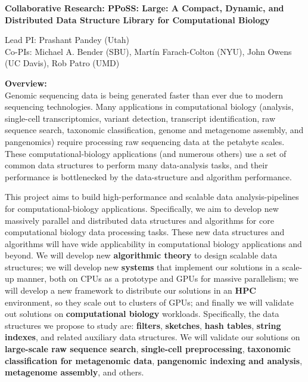 
\begin{center}
\bf
\Large
Collaborative Research: PPoSS\@: Large: A Compact, Dynamic, and Distributed Data
Structure Library for Computational Biology

\medskip
\small
Lead PI: Prashant Pandey (Utah)\\
Co-PIs: Michael A. Bender (SBU), Mart\'{i}n Farach-Colton (NYU), John Owens (UC Davis), Rob Patro (UMD)
\end{center}

\noindent \textbf{\large Overview:}\\
Genomic sequencing data is being generated faster than ever due to modern sequencing technologies.
Many applications in computational biology (\kmer analysis, single-cell transcriptomics, variant detection, transcript identification, raw sequence search, taxonomic classification, genome and metagenome assembly, and pangenomics) require processing raw sequencing data at the petabyte scales.
%
These computational-biology applications (and numerous others) use a set of common data structures to perform many data-analysis tasks, and their performance is bottlenecked by the data-structure and algorithm performance.

This project aims to build high-performance and scalable data analysis-pipelines for computational-biology applications. Specifically, we aim to develop new massively parallel and distributed data structures and algorithms for core computational biology data processing tasks. These new data structures and algorithms will have wide applicability in computational biology applications and beyond.
%
We will develop new \textbf{algorithmic theory} to design scalable data structures; we will develop new \textbf{systems} that implement our solutions in a scale-up manner,  both on CPUs as a prototype and GPUs for massive parallelism; we will develop a new framework to distribute our solutions in an \textbf{HPC} environment, so they scale out to clusters of GPUs; and finally we will validate out solutions on \textbf{computational biology} workloads.
%
Specifically, the data structures we propose to study are: \textbf{filters}, \textbf{sketches}, \textbf{hash tables}, \textbf{string indexes}, and related auxiliary data structures.  We will validate our solutions on \textbf{large-scale raw sequence search}, \textbf{single-cell preprocessing}, \textbf{taxonomic classification for metagenomic data}, \textbf{pangenomic indexing and analysis}, \textbf{metagenome assembly}, and others.

